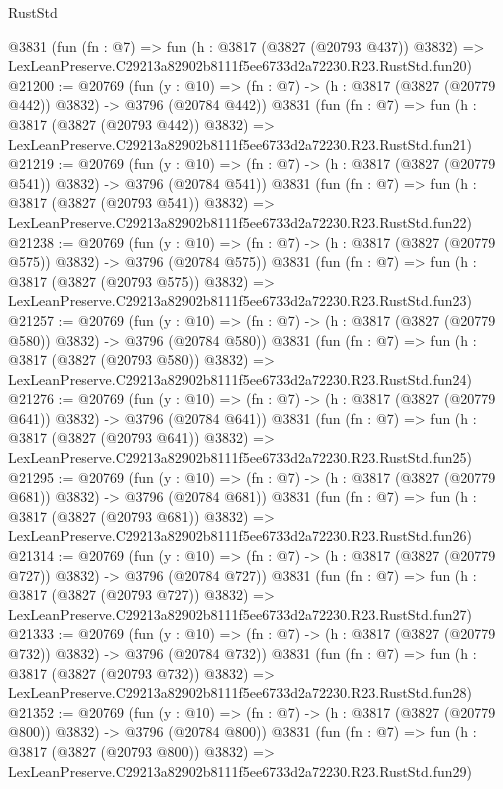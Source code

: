\begin{lexlean}{RustStd}
\begin{coremodule}
    @3831
    (fun (fn : @7) =>
    fun (h : @3817 (@3827 (@20793 @437)) @3832) =>
    LexLeanPreserve.C29213a82902b8111f5ee6733d2a72230.R23.RustStd.fun20)
@21200 := @20769
    (fun (y : @10) => (fn : @7) -> (h : @3817 (@3827 (@20779 @442)) @3832) -> @3796 (@20784 @442))
    @3831
    (fun (fn : @7) =>
    fun (h : @3817 (@3827 (@20793 @442)) @3832) =>
    LexLeanPreserve.C29213a82902b8111f5ee6733d2a72230.R23.RustStd.fun21)
@21219 := @20769
    (fun (y : @10) => (fn : @7) -> (h : @3817 (@3827 (@20779 @541)) @3832) -> @3796 (@20784 @541))
    @3831
    (fun (fn : @7) =>
    fun (h : @3817 (@3827 (@20793 @541)) @3832) =>
    LexLeanPreserve.C29213a82902b8111f5ee6733d2a72230.R23.RustStd.fun22)
@21238 := @20769
    (fun (y : @10) => (fn : @7) -> (h : @3817 (@3827 (@20779 @575)) @3832) -> @3796 (@20784 @575))
    @3831
    (fun (fn : @7) =>
    fun (h : @3817 (@3827 (@20793 @575)) @3832) =>
    LexLeanPreserve.C29213a82902b8111f5ee6733d2a72230.R23.RustStd.fun23)
@21257 := @20769
    (fun (y : @10) => (fn : @7) -> (h : @3817 (@3827 (@20779 @580)) @3832) -> @3796 (@20784 @580))
    @3831
    (fun (fn : @7) =>
    fun (h : @3817 (@3827 (@20793 @580)) @3832) =>
    LexLeanPreserve.C29213a82902b8111f5ee6733d2a72230.R23.RustStd.fun24)
@21276 := @20769
    (fun (y : @10) => (fn : @7) -> (h : @3817 (@3827 (@20779 @641)) @3832) -> @3796 (@20784 @641))
    @3831
    (fun (fn : @7) =>
    fun (h : @3817 (@3827 (@20793 @641)) @3832) =>
    LexLeanPreserve.C29213a82902b8111f5ee6733d2a72230.R23.RustStd.fun25)
@21295 := @20769
    (fun (y : @10) => (fn : @7) -> (h : @3817 (@3827 (@20779 @681)) @3832) -> @3796 (@20784 @681))
    @3831
    (fun (fn : @7) =>
    fun (h : @3817 (@3827 (@20793 @681)) @3832) =>
    LexLeanPreserve.C29213a82902b8111f5ee6733d2a72230.R23.RustStd.fun26)
@21314 := @20769
    (fun (y : @10) => (fn : @7) -> (h : @3817 (@3827 (@20779 @727)) @3832) -> @3796 (@20784 @727))
    @3831
    (fun (fn : @7) =>
    fun (h : @3817 (@3827 (@20793 @727)) @3832) =>
    LexLeanPreserve.C29213a82902b8111f5ee6733d2a72230.R23.RustStd.fun27)
@21333 := @20769
    (fun (y : @10) => (fn : @7) -> (h : @3817 (@3827 (@20779 @732)) @3832) -> @3796 (@20784 @732))
    @3831
    (fun (fn : @7) =>
    fun (h : @3817 (@3827 (@20793 @732)) @3832) =>
    LexLeanPreserve.C29213a82902b8111f5ee6733d2a72230.R23.RustStd.fun28)
@21352 := @20769
    (fun (y : @10) => (fn : @7) -> (h : @3817 (@3827 (@20779 @800)) @3832) -> @3796 (@20784 @800))
    @3831
    (fun (fn : @7) =>
    fun (h : @3817 (@3827 (@20793 @800)) @3832) =>
    LexLeanPreserve.C29213a82902b8111f5ee6733d2a72230.R23.RustStd.fun29)

\end{coremodule}
\end{lexlean}
